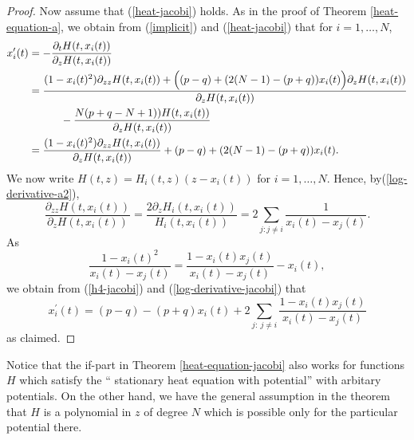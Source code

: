 \documentclass[reqno]{amsart}
\theoremstyle{plain}
\theoremstyle{definition}
\numberwithin{equation}{section}
\begin{document}
\begin{proof}
Now assume that (\ref{heat-jacobi}) holds. As in the proof of Theorem \ref{heat-equation-a}, we obtain from
(\ref{implicit}) and (\ref{heat-jacobi}) that for $i=1,\ldots,N$,
  \begin{align}\label{h4-jacobi}
    x_i^\prime(t)&=- \frac{\partial_{t} H(t,x_i(t))}{\partial_{z} H(t,x_i(t))} \\&=
    \frac{ (1-x_i(t)^2)\partial_{zz} H(t,x_i(t)) + \Bigl( (p-q)+(2(N-1)-(p+q))x_i(t)\Bigr)\partial_{z} H(t,x_i(t))}{\partial_{z} H(t,x_i(t))}\notag\\
    &\quad\quad\quad-  \frac{N(p+q-N+1))H(t,x_i(t))}{\partial_{z} H(t,x_i(t))}\notag
\\&= \frac{ (1-x_i(t)^2)\partial_{zz} H(t,x_i(t)) }{ \partial_{z} H(t,x_i(t))} +   (p-q)+(2(N-1)-(p+q))x_i(t).\notag
 \end{align}
  We now write $H(t,z)=H_i(t,z)(z-x_i(t))$ for $i=1,\ldots,N$. Hence, by(\ref{log-derivative-a2}),
 \begin{equation}\label{log-derivative-jacobi}
   \frac{\partial_{zz} H(t,x_i(t))}{\partial_{z} H(t,x_i(t))}=   \frac{2\partial_{z} H_i(t,x_i(t))}{ H_i(t,x_i(t))}=
  2 \sum_{j:j\ne i} \frac{1}{x_i(t)-x_j(t)}. \end{equation}
 As
 $$  \frac{1-x_i(t)^2}{x_i(t)-x_j(t)}=  \frac{1-x_i(t)x_j(t)}{x_i(t)-x_j(t)} - x_i(t),$$
 we obtain from (\ref{h4-jacobi}) and (\ref{log-derivative-jacobi}) that
 $$  x_i^\prime(t)=(p-q)-(p+q)x_i(t)	+2\sum_{j:\> j\neq i}\frac{1-x_i(t)x_j(t)}{x_i(t)-x_j(t)}$$
 as claimed.
 \end{proof}

 Notice that the  if-part in Theorem \ref{heat-equation-jacobi} also works for functions $H$ which satisfy
 the `` stationary heat equation with potential''  with  arbitary potentials.  On the other hand, we have the general assumption in the theorem
 that
 $H$ is a polynomial in $z$ of degree $N$ which is possible only for the particular potential there.

 \medskip
\end{document}
